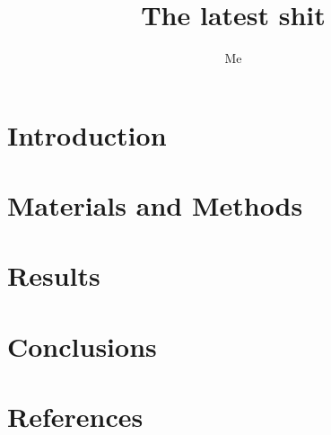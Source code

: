 \documentclass[11pt,letterpaper]{article}
\title{The latest shit}
\author[1]{Me}
\affil[1]{My Institute}
\begin{document}
\maketitle

\begin{abstract}
  
\end{abstract}



\section{Introduction}


\section{Materials and Methods}


\section{Results}


\section{Conclusions}


\section{References}
\printbibliography[heading=none]
\end{document}
